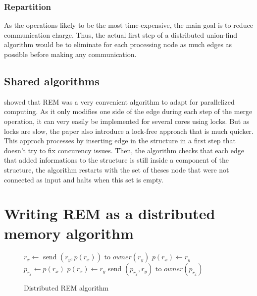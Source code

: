 \documentclass[12px]{article}
\begin{document}
      \subsubsection{Repartition}
        As the operations likely to be the most time-expensive, the main goal is to reduce communication charge.
        Thus, the actual first step of a distributed union-find algorithm would be to eliminate for each processing node as much edges as possible before making any communication.

    \subsection{Shared algorithms}
       showed that REM was a very convenient algorithm to adapt for parallelized computing. As it only modifies one side of the edge during each step of the merge operation, it can very easily be implemented for several cores using locks.
      But as locks are slow, the paper also introduce a lock-free approach that is much quicker. This approch processes by inserting edge in the structure in a first step that doesn't try to fix concurency issues. Then, the algorithm checks that each edge that added informations to the structure is still inside a component of the structure, the algorithm restarts with the set of theses node that were not connected as input and halts when this set is empty.


  \section{Writing REM as a distributed memory algorithm}
    \setlength\intextsep{0pt}
    \begin{wrapfigure}{r}{6.5cm}
      \centering
      \begin{minipage}{\linewidth}
        \begin{algorithm}[H]
          \caption{Distributed REM algorithm}%
          \label{alg:rem_distributed}
          \begin{algorithmic}[1]
              \State $r_x \gets$ 
              \State
                \State send $(r_y, p(r_x))$ to $owner(r_y)$
                  \State $p(r_x) \gets r_y$
                \Else
                  \State $p_{r_x} \gets p(r_x)$
                  \State $p(r_x) \gets r_y$
                  \State send $(p_{r_x}, r_y)$ to $owner(p_{r_x})$
                \EndIf
              \EndIf
            \EndFunction
         \end{algorithmic}
        \end{algorithm}
      \end{minipage}
    \end{wrapfigure}
\end{document}
